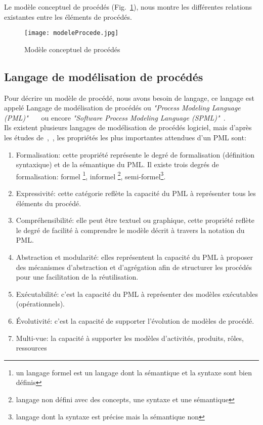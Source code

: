 \clearpage
Le modèle conceptuel de procédés (Fig.~\ref{mcp}), nous montre les différentes relations existantes entre les éléments de procédés.
\begin{figure}[h]
\centering
\texttt{[image: modeleProcede.jpg]}
\caption{\label{mcp}Modèle conceptuel de procédés~\cite{hnt10}}
\end{figure}

\subsection{Langage de modélisation de procédés }
Pour décrire un modèle de procédé, nous avons besoin de langage, ce langage est appelé \og Langage de modélisation de procédés \fg{} ou \textit{"Process Modeling Language (PML)"}~\cite{ac}~\cite{rc}~\cite{sl} ou encore \textit{"Software Process Modeling Language (SPML)"}~\cite{alm}. \\
Ils existent plusieurs langages de modélisation de procédés logiciel, mais d'après les études de~\cite{abgm},\cite{vra}~\cite{jab}, les propriétés les plus importantes attendues d'un PML sont:
\begin{enumerate}
\item Formalisation: cette propriété représente le degré de formalisation (définition syntaxique) et de la sémantique du PML. Il existe trois degrés de formalisation: formel \footnote{un langage formel est un langage dont la sémantique et la syntaxe sont bien définis}, informel \footnote{langage non défini avec des concepts, une syntaxe et une sémantique}, semi-formel\footnote{langage dont la syntaxe est précise mais la sémantique non}.
\item Expressivité: cette catégorie reflète la capacité du PML à représenter tous les éléments du procédé.
\item Compréhensibilité: elle peut être textuel ou graphique, cette propriété reflète le degré de facilité à comprendre le modèle décrit à travers la notation du PML.
\item Abstraction et modularité: elles représentent la capacité du PML à proposer des mécanismes d'abstraction et d'agrégation afin de structurer les procédés pour une facilitation de la réutilisation.
\item Exécutabilité: c'est la capacité du PML à représenter des modèles exécutables (opérationnels). 
\item Évolutivité: c'est la capacité de supporter l'évolution de modèles de procédé. 
\item Multi-vue: la capacité à supporter les modèles d'activités, produits, rôles, ressources 
\end{enumerate}
